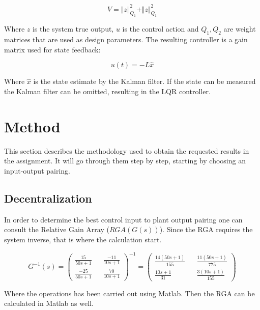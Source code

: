 \documentclass[a4paper, titlepage]{article}
\begin{document}
\begin{equation}
V = \Vert z \Vert^2_{Q_1} + \Vert z \Vert^2_{Q_1}
\end{equation}

Where $z$ is the system true output, $u$ is the control action and $Q_1, Q_2$ are weight matrices that are used as design parameters.
The resulting controller is a gain matrix used for state feedback:

\begin{equation}
u(t) = -L\hat{x}
\end{equation}

Where $\hat{x}$ is the state estimate by the Kalman filter.
If the state can be measured the Kalman filter can be omitted, resulting in the LQR controller.
\citep[~p.242-247]{glad00}

\section{Method}
This section describes the methodology used to obtain the requested results in the assignment.
It will go through them step by step, starting by choosing an input-output pairing.

\subsection{Decentralization}
In order to determine the best control input to plant output pairing one can consult the Relative Gain Array ($RGA(G(s))$).
Since the RGA requires the system inverse, that is where the calculation start.

\begin{equation}
G^{-1}(s) = 
\begin{pmatrix}
\frac{15}{50s + 1} && \frac{-11}{10s + 1} \\[6pt]
\frac{-25}{50s + 1} && \frac{70}{10s + 1}
\end{pmatrix}^{-1} = 
\begin{pmatrix}
\frac{14(50s + 1)}{155} && \frac{11(50s + 1)}{775} \\[6pt]
\frac{10s + 1}{31} && \frac{3(10s + 1)}{155}
\end{pmatrix}
\label{equ:inverse}
\end{equation}

Where the operations has been carried out using Matlab.
Then the RGA can be calculated in Matlab as well.
\end{document}
